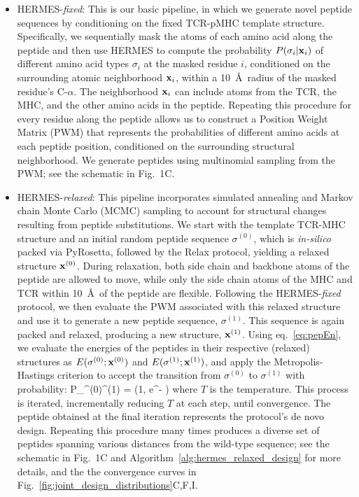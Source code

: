 \begin{itemize}
\item HERMES-{\em fixed}: This is our basic pipeline, in which we generate novel peptide sequences
by conditioning on the fixed TCR-pMHC template structure.
Specifically, we sequentially mask the atoms of each amino acid along the peptide and then use
HERMES to compute the probability $P(\sigma_i|{\bf x}_i)$ of different amino acid types $\sigma_i$
at the masked residue $i$, conditioned on the surrounding atomic neighborhood ${\bf x}_i$, within a
10~\AA \, radius of the masked residue's C-$\alpha$. The neighborhood ${\bf x}_i$ can include atoms
from the TCR, the MHC, and the other amino acids in the peptide. Repeating this procedure for every
residue along the peptide allows us to construct a Position Weight Matrix (PWM) that represents the
probabilities of different amino acids at each peptide position, conditioned on the surrounding
structural neighborhood. We generate peptides using multinomial sampling from the PWM; see the
schematic in Fig.~1C.

\item HERMES-{\em relaxed}: This pipeline incorporates simulated annealing and Markov chain Monte
Carlo (MCMC) sampling to account for structural changes resulting from peptide substitutions. We
start with the template TCR-MHC structure and an initial random peptide sequence $\sigma^{(0)}$,
which is {\em in-silico} packed via PyRosetta, followed by the Relax protocol, yielding a relaxed
structure ${\bf x}^{(0)}$. During relaxation, both side chain and backbone atoms of the peptide are
allowed to move, while only the side chain atoms of the MHC and TCR within 10~\AA~of the peptide are
flexible. Following the HERMES-{\em fixed} protocol, we then evaluate the PWM associated with this
relaxed structure and use it to generate a new peptide sequence, $\sigma^{(1)}$. This sequence is
again packed and relaxed, producing a new structure, ${\bf x}^{(1)}$. Using eq.~\ref{eq:pepEn}, we
evaluate the energies of the peptides in their respective (relaxed) structures as $E(\sigma^{(0)} ;
{\bf x}^{(0)})$ and $E(\sigma^{(1)} ; {\bf x}^{(1)})$, and apply the Metropolis-Hastings criterion
to accept the transition from $\sigma^{(0)}$ to $\sigma^{(1)}$ with probability:
\EQ P_{\sigma^{(0)}\to \sigma^{(1)}} = \left(1, e^{- }\right)\EE
where $T$ is the temperature. This process is iterated, incrementally reducing $T$ at each step,
until convergence. The peptide obtained at the final iteration represents the protocol’s de novo
design. Repeating this procedure many times produces a diverse set of peptides spanning various
distances from the wild-type sequence; see the schematic in Fig.~1C and
Algorithm~\ref{alg:hermes_relaxed_design} for more details, and the the convergence curves in
Fig.~\ref{fig:joint_design_distributions}C,F,I.\\
\vspace{1cm}


\end{itemize}
